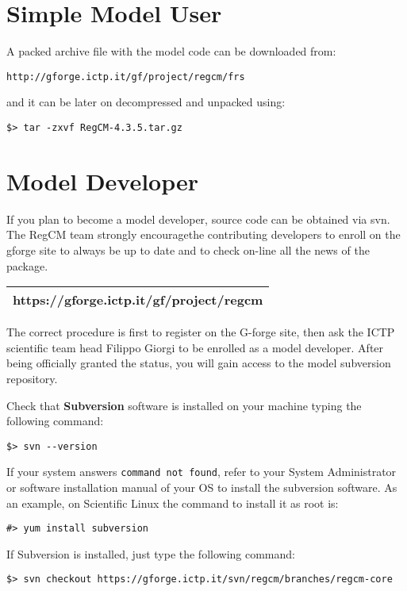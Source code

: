%
%

\section{Simple Model User}

A packed archive file with the model code can be downloaded from:

\begin{Verbatim}
http://gforge.ictp.it/gf/project/regcm/frs
\end{Verbatim}

and it can be later on decompressed and unpacked using:

\begin{Verbatim}
$> tar -zxvf RegCM-4.3.5.tar.gz
\end{Verbatim}

\section{Model Developer}

If you plan to become a model developer, source code can be obtained via svn.
The RegCM team strongly encouragethe contributing developers to enroll on
the gforge site to always be up to date and to check on-line all the news of
the package.

\vspace{0.5cm}
\begin{tabular}{|c|}
\hline
{\bf https://gforge.ictp.it/gf/project/regcm} \\
\hline
\end{tabular}
\vspace{0.5cm}

The correct procedure is first to register on the G-forge site, then ask
the ICTP scientific team head Filippo Giorgi to be enrolled as a model
developer. After being officially granted the status, you will gain
access to the model subversion repository.

Check that {\bf Subversion} software is installed on your machine typing
the following command:

\begin{verbatim}
$> svn --version
\end{verbatim}

If your system answers \verb=command not found=, refer to your System
Administrator or software installation manual of your OS to install the
subversion software. As an example, on Scientific Linux the command
to install it as root is:

\begin{verbatim}
#> yum install subversion
\end{verbatim}

If Subversion is installed, just type the following command:

\begin{verbatim}
$> svn checkout https://gforge.ictp.it/svn/regcm/branches/regcm-core
\end{verbatim}
